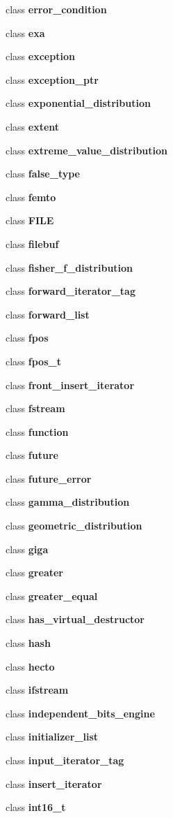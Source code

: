 \begin{DoxyCompactItemize}
class {\bf error\+\_\+condition}
\item 
class {\bf exa}
\item 
class {\bf exception}
\item 
class {\bf exception\+\_\+ptr}
\item 
class {\bf exponential\+\_\+distribution}
\item 
class {\bf extent}
\item 
class {\bf extreme\+\_\+value\+\_\+distribution}
\item 
class {\bf false\+\_\+type}
\item 
class {\bf femto}
\item 
class {\bf F\+I\+LE}
\item 
class {\bf filebuf}
\item 
class {\bf fisher\+\_\+f\+\_\+distribution}
\item 
class {\bf forward\+\_\+iterator\+\_\+tag}
\item 
class {\bf forward\+\_\+list}
\item 
class {\bf fpos}
\item 
class {\bf fpos\+\_\+t}
\item 
class {\bf front\+\_\+insert\+\_\+iterator}
\item 
class {\bf fstream}
\item 
class {\bf function}
\item 
class {\bf future}
\item 
class {\bf future\+\_\+error}
\item 
class {\bf gamma\+\_\+distribution}
\item 
class {\bf geometric\+\_\+distribution}
\item 
class {\bf giga}
\item 
class {\bf greater}
\item 
class {\bf greater\+\_\+equal}
\item 
class {\bf has\+\_\+virtual\+\_\+destructor}
\item 
class {\bf hash}
\item 
class {\bf hecto}
\item 
class {\bf ifstream}
\item 
class {\bf independent\+\_\+bits\+\_\+engine}
\item 
class {\bf initializer\+\_\+list}
\item 
class {\bf input\+\_\+iterator\+\_\+tag}
\item 
class {\bf insert\+\_\+iterator}
\item 
class {\bf int16\+\_\+t}

\end{DoxyCompactItemize}
